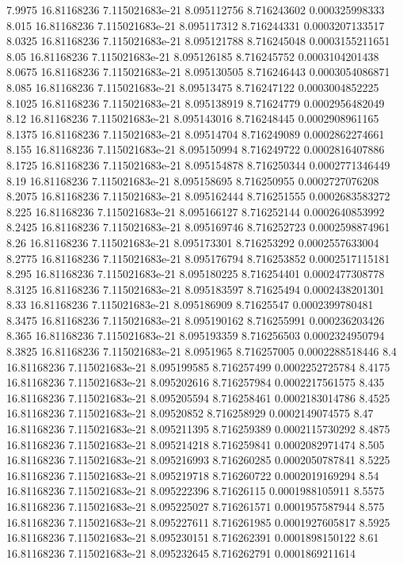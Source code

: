 {7.9975 16.81168236 7.115021683e-21 8.095112756 8.716243602 0.000325998333
8.015 16.81168236 7.115021683e-21 8.095117312 8.716244331 0.0003207133517
8.0325 16.81168236 7.115021683e-21 8.095121788 8.716245048 0.0003155211651
8.05 16.81168236 7.115021683e-21 8.095126185 8.716245752 0.0003104201438
8.0675 16.81168236 7.115021683e-21 8.095130505 8.716246443 0.0003054086871
8.085 16.81168236 7.115021683e-21 8.09513475 8.716247122 0.0003004852225
8.1025 16.81168236 7.115021683e-21 8.095138919 8.71624779 0.0002956482049
8.12 16.81168236 7.115021683e-21 8.095143016 8.716248445 0.0002908961165
8.1375 16.81168236 7.115021683e-21 8.09514704 8.716249089 0.0002862274661
8.155 16.81168236 7.115021683e-21 8.095150994 8.716249722 0.0002816407886
8.1725 16.81168236 7.115021683e-21 8.095154878 8.716250344 0.0002771346449
8.19 16.81168236 7.115021683e-21 8.095158695 8.716250955 0.0002727076208
8.2075 16.81168236 7.115021683e-21 8.095162444 8.716251555 0.0002683583272
8.225 16.81168236 7.115021683e-21 8.095166127 8.716252144 0.0002640853992
8.2425 16.81168236 7.115021683e-21 8.095169746 8.716252723 0.0002598874961
8.26 16.81168236 7.115021683e-21 8.095173301 8.716253292 0.0002557633004
8.2775 16.81168236 7.115021683e-21 8.095176794 8.716253852 0.0002517115181
8.295 16.81168236 7.115021683e-21 8.095180225 8.716254401 0.0002477308778
8.3125 16.81168236 7.115021683e-21 8.095183597 8.71625494 0.0002438201301
8.33 16.81168236 7.115021683e-21 8.095186909 8.71625547 0.0002399780481
8.3475 16.81168236 7.115021683e-21 8.095190162 8.716255991 0.000236203426
8.365 16.81168236 7.115021683e-21 8.095193359 8.716256503 0.0002324950794
8.3825 16.81168236 7.115021683e-21 8.0951965 8.716257005 0.0002288518446
8.4 16.81168236 7.115021683e-21 8.095199585 8.716257499 0.0002252725784
8.4175 16.81168236 7.115021683e-21 8.095202616 8.716257984 0.0002217561575
8.435 16.81168236 7.115021683e-21 8.095205594 8.716258461 0.0002183014786
8.4525 16.81168236 7.115021683e-21 8.09520852 8.716258929 0.0002149074575
8.47 16.81168236 7.115021683e-21 8.095211395 8.716259389 0.0002115730292
8.4875 16.81168236 7.115021683e-21 8.095214218 8.716259841 0.0002082971474
8.505 16.81168236 7.115021683e-21 8.095216993 8.716260285 0.0002050787841
8.5225 16.81168236 7.115021683e-21 8.095219718 8.716260722 0.0002019169294
8.54 16.81168236 7.115021683e-21 8.095222396 8.71626115 0.0001988105911
8.5575 16.81168236 7.115021683e-21 8.095225027 8.716261571 0.0001957587944
8.575 16.81168236 7.115021683e-21 8.095227611 8.716261985 0.0001927605817
8.5925 16.81168236 7.115021683e-21 8.095230151 8.716262391 0.0001898150122
8.61 16.81168236 7.115021683e-21 8.095232645 8.716262791 0.0001869211614
}
